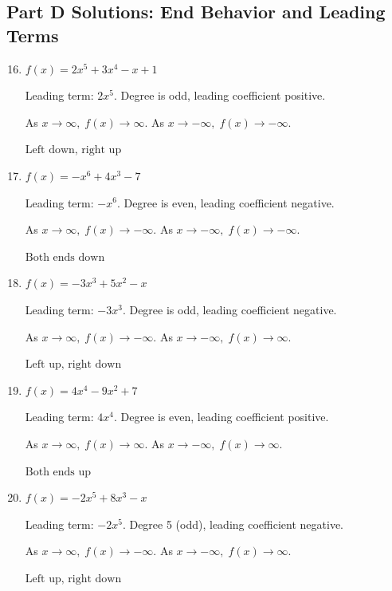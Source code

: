 \documentclass[14pt]{extarticle}
\begin{document}
\subsection*{Part D Solutions: End Behavior and Leading Terms}
\begin{enumerate}
  \setcounter{enumi}{15}
  \item \(f(x) = 2x^5 + 3x^4 - x + 1\)

  Leading term: \(2x^5.\)  
  Degree is odd, leading coefficient positive.

  As \(x \to \infty,\; f(x) \to \infty.\)  
  As \(x \to -\infty,\; f(x) \to -\infty.\)

  \(\boxed{\text{Left down, right up}}\)

  \item \(f(x) = -x^6 + 4x^3 - 7\)

  Leading term: \(-x^6.\)  
  Degree is even, leading coefficient negative.

  As \(x \to \infty,\; f(x) \to -\infty.\)  
  As \(x \to -\infty,\; f(x) \to -\infty.\)

  \(\boxed{\text{Both ends down}}\)

  \item \(f(x) = -3x^3 + 5x^2 - x\)

  Leading term: \(-3x^3.\)  
  Degree is odd, leading coefficient negative.

  As \(x \to \infty,\; f(x) \to -\infty.\)  
  As \(x \to -\infty,\; f(x) \to \infty.\)

  \(\boxed{\text{Left up, right down}}\)

  \item \(f(x) = 4x^4 - 9x^2 + 7\)

  Leading term: \(4x^4.\)  
  Degree is even, leading coefficient positive.

  As \(x \to \infty,\; f(x) \to \infty.\)  
  As \(x \to -\infty,\; f(x) \to \infty.\)

  \(\boxed{\text{Both ends up}}\)

  \item \(f(x) = -2x^5 + 8x^3 - x\)

  Leading term: \(-2x^5.\)  
  Degree 5 (odd), leading coefficient negative.

  As \(x \to \infty,\; f(x) \to -\infty.\)  
  As \(x \to -\infty,\; f(x) \to \infty.\)

  \(\boxed{\text{Left up, right down}}\)
\end{enumerate}
\end{document}
